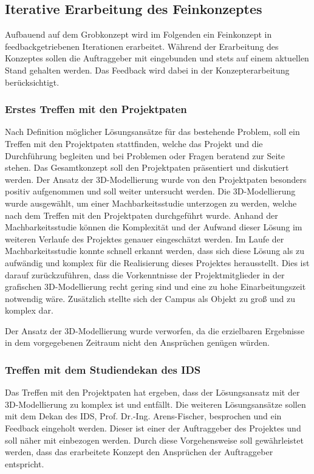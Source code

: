\subsection{Iterative Erarbeitung des Feinkonzeptes}
\label{sec:ErarbeitungFeinkonzept}

Aufbauend auf dem Grobkonzept wird im Folgenden ein Feinkonzept in
feedbackgetriebenen Iterationen erarbeitet.
Während der Erarbeitung des Konzeptes sollen die Auftraggeber mit eingebunden und stets auf einem aktuellen
Stand gehalten werden. Das Feedback wird dabei in der Konzepterarbeitung berücksichtigt.


\subsubsection*{Erstes Treffen mit den Projektpaten}
\label{sec:Treffen1}

Nach Definition möglicher Lösungsansätze für das bestehende Problem, soll ein Treffen mit den Projektpaten stattfinden, 
welche das Projekt und die Durchführung begleiten und bei Problemen oder Fragen beratend zur Seite stehen. Das 
Gesamtkonzept soll den Projektpaten präsentiert und diskutiert werden. Der Ansatz der 3D-Modellierung wurde von den 
Projektpaten besonders positiv aufgenommen und soll weiter untersucht werden. 
Die 3D-Modellierung wurde ausgewählt, um einer Machbarkeitsstudie unterzogen zu werden, welche nach dem Treffen mit den 
Projektpaten durchgeführt wurde. Anhand der Machbarkeitsstudie können die Komplexität und der Aufwand dieser Lösung im 
weiteren Verlaufe des Projektes genauer eingeschätzt werden.
Im Laufe der Machbarkeitsstudie konnte schnell erkannt werden, dass sich diese Lösung als zu aufwändig und komplex für die 
Realisierung dieses Projektes herausstellt. Dies ist darauf zurückzuführen, dass die Vorkenntnisse der Projektmitglieder 
in der grafischen 3D-Modellierung recht gering sind und eine zu hohe Einarbeitungszeit notwendig wäre. Zusätzlich stellte 
sich der Campus als Objekt zu groß und zu komplex dar. 

Der Ansatz der 3D-Modellierung wurde verworfen, da die erzielbaren Ergebnisse in dem vorgegebenen Zeitraum nicht den 
Ansprüchen genügen würden.


\subsubsection*{Treffen mit dem Studiendekan des IDS}
\label{sec:Treffen2}

Das Treffen mit den Projektpaten hat ergeben, dass der Lösungsansatz mit der 3D-Modellierung zu komplex ist und entfällt.
 Die weiteren Lösungsansätze sollen mit dem Dekan des IDS, Prof. Dr.-Ing. Arens-Fischer, besprochen und ein Feedback 
eingeholt werden. Dieser ist einer der Auftraggeber des Projektes und soll näher mit einbezogen werden. Durch diese 
Vorgehensweise soll gewährleistet werden, dass das erarbeitete Konzept den Ansprüchen der Auftraggeber entspricht.

